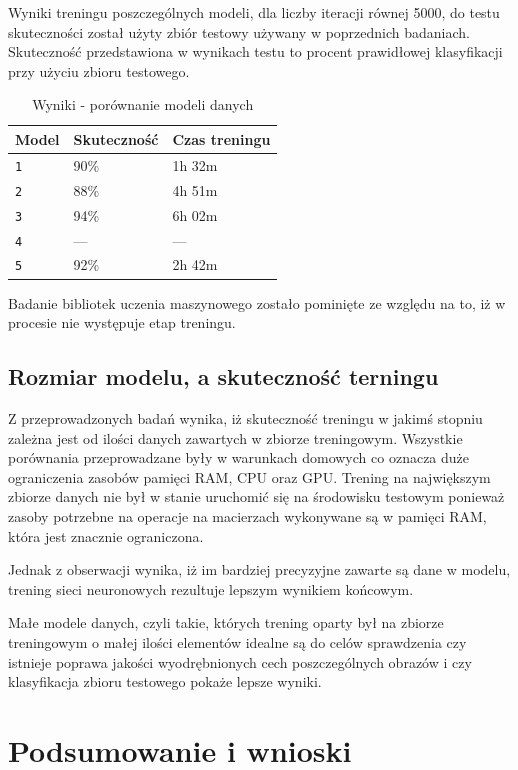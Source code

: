 \documentclass[brudnopis]{xmgr}
\begin{document}
Wyniki treningu poszczególnych modeli, dla liczby iteracji równej 5000, do testu skuteczności został użyty zbiór testowy używany w poprzednich badaniach. Skuteczność przedstawiona w wynikach testu to procent prawidłowej klasyfikacji przy użyciu zbioru testowego.

\begin{table}[!htb]
\begin{tabular}{|l|l|l|} \hline
Model & Skuteczność & Czas treningu  \\ \hline
\texttt 1 & 90\% & 1h 32m \\ \hline
\texttt 2 & 88\% & 4h 51m \\ \hline
\texttt 3 & 94\% & 6h 02m \\ \hline
\texttt 4 & --- & --- \\ \hline 
\texttt 5 & 92\% & 2h 42m \\ \hline
\end{tabular}
\caption{Wyniki - porównanie modeli danych}
\end{table}

Badanie bibliotek uczenia maszynowego zostało pominięte ze względu na to, iż w procesie nie występuje etap treningu.

\section{Rozmiar modelu, a skuteczność terningu}

Z przeprowadzonych badań wynika, iż skuteczność treningu w jakimś stopniu zależna jest od ilości danych zawartych w zbiorze treningowym. Wszystkie porównania przeprowadzane były w warunkach domowych co oznacza duże ograniczenia zasobów pamięci RAM, CPU oraz GPU. Trening na największym zbiorze danych nie był w stanie uruchomić się na środowisku testowym ponieważ zasoby potrzebne na operacje na macierzach wykonywane są w pamięci RAM, która jest znacznie ograniczona. 

Jednak z obserwacji wynika, iż im bardziej precyzyjne zawarte są dane w modelu, trening sieci neuronowych rezultuje lepszym wynikiem końcowym. 

Małe modele danych, czyli takie, których trening oparty był na zbiorze treningowym o małej ilości elementów idealne są do celów sprawdzenia czy istnieje poprawa jakości wyodrębnionych cech poszczególnych obrazów i czy klasyfikacja zbioru testowego pokaże lepsze wyniki.

\chapter{Podsumowanie i wnioski}
\end{document}
